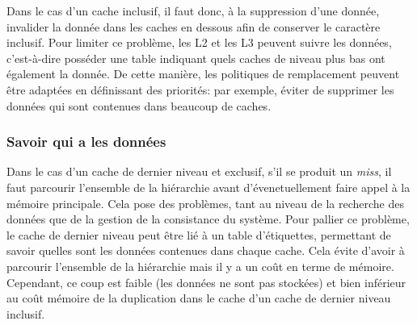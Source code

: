 Dans le cas d'un cache inclusif, il faut donc, à la suppression d'une donnée, invalider la donnée dans les caches en dessous afin de conserver le caractère inclusif. Pour limiter ce problème, les L2 et les L3 peuvent suivre les données, c'est-à-dire posséder une table indiquant quels caches de niveau plus bas ont également la donnée. De cette manière, les politiques de remplacement peuvent être adaptées en définissant des priorités: par exemple, éviter de supprimer les données qui sont contenues dans beaucoup de caches.

\subsubsection{Savoir qui a les données}
Dans le cas d'un cache de dernier niveau et exclusif, s'il se produit un \textit{miss}, il faut parcourir l'ensemble de la hiérarchie avant d'évenetuellement faire appel à la mémoire principale. Cela pose des problèmes, tant au niveau de la recherche des données que de la gestion de la consistance du système. Pour pallier ce problème, le cache de dernier niveau peut être lié à un table d'étiquettes, permettant de savoir quelles sont les données contenues dans chaque cache. Cela évite d'avoir à parcourir l'ensemble de la hiérarchie mais il y a un coût en terme de mémoire. Cependant, ce coup est faible (les données ne sont pas stockées) et bien inférieur au coût mémoire de la duplication dans le cache d'un cache de dernier niveau inclusif.
